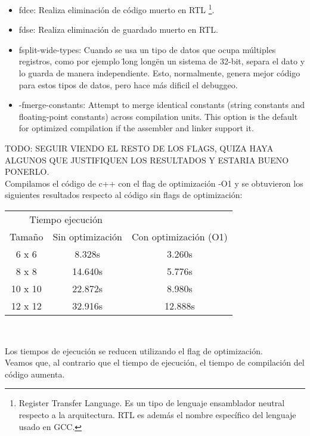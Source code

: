 \begin{itemize}
	\item fdce: Realiza eliminación de código muerto en RTL \footnote{Register Transfer Language. Es un tipo de lenguaje ensamblador neutral respecto a la arquitectura. RTL es además el nombre específico del lenguaje usado en GCC.}.
	\item fdse: Realiza eliminación de guardado muerto en RTL.
	\item fsplit-wide-types: Cuando se usa un tipo de datos que ocupa múltiples registros, como por ejemplo \"long long\" en un sistema de 32-bit, separa el dato y lo guarda de manera independiente. Esto, normalmente, genera mejor código para estos tipos de datos, pero hace más dificil el debuggeo.
	\item -fmerge-constants: Attempt to merge identical constants (string constants and floating-point constants) across compilation units. This option is the default for optimized compilation if the assembler and linker support it.
\end{itemize}

TODO: SEGUIR VIENDO EL RESTO DE LOS FLAGS, QUIZA HAYA ALGUNOS QUE JUSTIFIQUEN LOS RESULTADOS Y ESTARIA BUENO PONERLO.\\%

Compilamos el código de c++ con el flag de optimización -O1 y se obtuvieron los siguientes resultados respecto al código sin flags de optimización:\\

\begin{center}
	\begin{tabular}{ccc}  
		\toprule 
		\multicolumn{2}{c}{Tiempo ejecución} \\
		\cmidrule(r){1-3}
		Tamaño & Sin optimización & Con optimización (O1)  \\
		\midrule
		6 x 6   &	8.328s 	&	3.260s	\\
		8 x 8	&	14.640s	&	5.776s	\\
		10 x 10	&	22.872s	&	8.980s	\\
		12 x 12 &	32.916s &   12.888s \\
		\bottomrule
	\end{tabular}\\
\end{center}

Los tiempos de ejecución se reducen utilizando el flag de optimización.\\

Veamos que, al contrario que el tiempo de ejecución, el tiempo de compilación del código aumenta.\\

